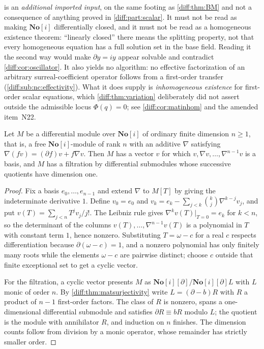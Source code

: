 \documentclass[11pt,letterpaper]{article}
\numberwithin{equation}{section}
\theoremstyle{definition}
\theoremstyle{remark}
\newcommand{\SC}{\mathbf{No}[i]}
\newcommand{\der}{\partial}
\begin{document}
\begin{warning}
\label{diff:warn:matimport}
 is an \emph{additional imported input}, on the
same footing as \cref{diff:thm:BM} and not a consequence of anything proved in
\cref{diff:part:scalar}. It must not be read as making $\SC$ differentially
closed, and it must not be read as a homogeneous existence theorem: ``linearly
closed'' there means the splitting property, not that every homogeneous
equation has a full solution set in the base field. Reading it the second way
would make $\der y=iy$ appear solvable and contradict
\cref{diff:cor:oscillator}. It also yields no algorithm: no effective
factorization of an arbitrary surreal-coefficient operator follows from a
first-order transfer (\cref{diff:sub:nc:effectivity}). What it does supply is
\emph{inhomogeneous existence} for first-order scalar equations, which
\cref{diff:thm:variation} deliberately did not assert outside the admissible
locus $\Phi(q)=0$; see \cref{diff:cor:matinhom} and the amended item~N22.
\end{warning}

\begin{lemma}
\label{diff:lem:matcyclic}
Let $M$ be a differential module over $\SC$ of ordinary finite dimension
$n\geq1$, that is, a free $\SC$-module of rank $n$ with an additive
$\nabla$ satisfying $\nabla(fv)=(\der f)v+f\nabla v$. Then $M$ has a vector
$v$ for which $v,\nabla v,\dots,\nabla^{n-1}v$ is a basis, and $M$ has a
filtration by differential submodules whose successive quotients have
dimension one.
\end{lemma}
\begin{proof}
Fix a basis $e_{0},\dots,e_{n-1}$ and extend $\nabla$ to $M[T]$ by giving the
indeterminate derivative $1$. Define $v_{0}=e_{0}$ and
$v_{k}=e_{k}-\sum_{j<k}\binom{k}{j}\nabla^{k-j}v_{j}$, and put
$v(T)=\sum_{j<n}T^{j}v_{j}/j!$. The Leibniz rule gives
$\nabla^{k}v(T)\big|_{T=0}=e_{k}$ for $k<n$, so the determinant of the columns
$v(T),\dots,\nabla^{n-1}v(T)$ is a polynomial in $T$ with constant term $1$,
hence nonzero. Substituting $T=\omega-c$ for a real $c$ respects
differentiation because $\der(\omega-c)=1$, and a nonzero polynomial has only
finitely many roots while the elements $\omega-c$ are pairwise distinct; choose
$c$ outside that finite exceptional set to get a cyclic vector.

For the filtration, a cyclic vector presents $M$ as $\SC[\der]/\SC[\der]L$
with $L$ monic of order $n$. By \cref{diff:thm:matsurjectivity} write
$L=(\der-b)R$ with $R$ a product of $n-1$ first-order factors. The class of
$R$ is nonzero, spans a one-dimensional differential submodule and satisfies
$\der R\equiv bR$ modulo $L$; the quotient is the module with annihilator $R$,
and induction on $n$ finishes. The dimension counts follow from division by a
monic operator, whose remainder has strictly smaller order.
\end{proof}
\end{document}
